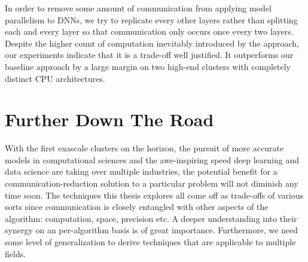 In order to remove some amount of communication from applying model parallelism 
to DNNs, we try to replicate every other layers rather than splitting each and 
every layer so that communication only occurs once every two layers. Despite the 
higher count of computation inevitably introduced by the approach, our 
experiments indicate that it is a trade-off well justified. It outperforms our 
baseline approach by a large margin on two high-end clusters with completely 
distinct CPU architectures. 

\section{Further Down The Road}
With the first exascale clusters on the horizon, the pursuit of more accurate 
models in computational sciences and the awe-inspiring speed deep learning and 
data science are taking over multiple industries, the potential benefit for a 
communication-reduction solution to a particular problem will not diminish any 
time soon. The techniques this thesis explores all come off as trade-offs of 
various sorts since communication is closely entangled with other aspects of the 
algorithm: computation, space, precision etc. A deeper understanding into their 
synergy on an per-algorithm basis is of great importance. Furthermore, we need 
some level of generalization to derive techniques that are applicable to 
multiple fields.  



